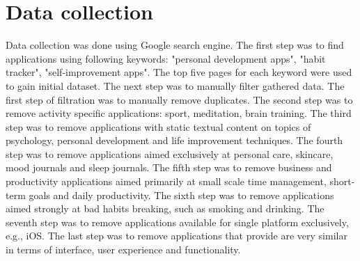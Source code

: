 
\section{Data collection}\label{sec:data-collection}

Data collection was done using Google search engine.
The first step was to find applications using following keywords: "personal development apps", "habit tracker", "self-improvement apps".
The top five pages for each keyword were used to gain initial dataset.
The next step was to manually filter gathered data.
The first step of filtration was to manually remove duplicates.
The second step was to remove activity specific applications: sport, meditation, brain training.
The third step was to remove applications with static textual content on topics of psychology, personal development and life improvement techniques.
The fourth step was to remove applications aimed exclusively at personal care, skincare, mood journals and sleep journals.
The fifth step was to remove business and productivity applications aimed primarily at small scale time management, short-term goals and daily productivity.
The sixth step was to remove applications aimed strongly at bad habits breaking, such as smoking and drinking.
The seventh step was to remove applications available for single platform exclusively, e.g., iOS\@.
The last step was to remove applications that provide are very similar in terms of interface, user experience and functionality.

